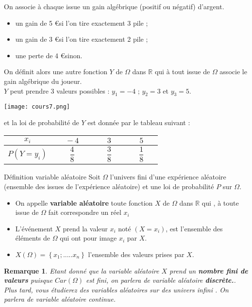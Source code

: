 \documentclass[10pt,a4paper]{article}
\theoremstyle{break}
\newtheorem{Rem}{Remarque}
\begin{document}
On associe à chaque issue un gain \og algébrique \fg{} (positif ou négatif) d'argent.
\begin{itemize}
	\item un gain de 5 \euro si l'on tire exactement 3 \og pile \fg{} ;
	\item un gain de 3 \euro si l'on tire exactement 2 \og pile \fg{} ;
	\item une perte de 4 \euro sinon.
\end{itemize}
On définit alors une autre fonction $Y$ de $\Omega$ dans $\mathbb{R}$ qui à tout issue de $\Omega$ associe le gain algébrique du joueur.\\
$Y$ peut prendre 3 valeurs possibles : $y_1=-4$ ; $y_2=3$ et $y_3=5$.
\begin{center}
	\texttt{[image: cours7.png]} 
\end{center}
et la loi de probabilité de $Y$ est donnée par le tableau suivant :
\begin{center}
	\begin{tabular}{|c|c|c|c|}
		\hline
		$\text{~~~~}x_{i}\text{~~~~}$&$\text{~~~~}-4\text{~~~~}$&$\text{~~~~}3\text{~~~~}$&$\text{~~~~}5\text{~~~~}$\\
		\hline
		$P(Y=y_{i})$&$\dfrac{4}{8}$&$\dfrac{3}{8} $&$\dfrac{1}{8} $\\
		\hline
	\end{tabular}
\end{center}
	\begin{bclogo}[couleur = yellow!30, arrondi = 0.1,logo=\bcbook]{Définition variable aléatoire}
	Soit $\Omega$ l'univers fini d'une expérience aléatoire (ensemble des issues de l'expérience aléatoire) et une loi de probabilité $P$ sur $\Omega$.
	\begin{itemize}
		\item On appelle  \textbf{variable aléatoire} toute fonction $X$ de $\Omega$  dans $\mathbb{R}$ qui , à toute issue de $\Omega$ fait correspondre un réel $x_i$
		\item L'événement \og $X$ prend la valeur $x_{i}$ \fg{} noté $(X=x_{i})$, est l'ensemble des éléments de $\Omega$ qui ont pour image $x_i$ par $X$.
		\item $X(\Omega)=\left\lbrace x_{1} ; ..... x_{n}\right\rbrace $ l'ensemble des valeurs prises par $X$.\\
	\end{itemize}
		\end{bclogo}
	\begin{Rem}
		Etant donné que la variable aléatoire $X$ prend un \textbf{nombre fini de valeurs} puisque $Car(\Omega)$ est fini, on parlera de variable aléatoire \textbf{discrète.}.\\
		Plus tard, vous étudierez des variables aléatoires sur des univers infini . On parlera de variable aléatoire continue.
	\end{Rem}
\end{document}
